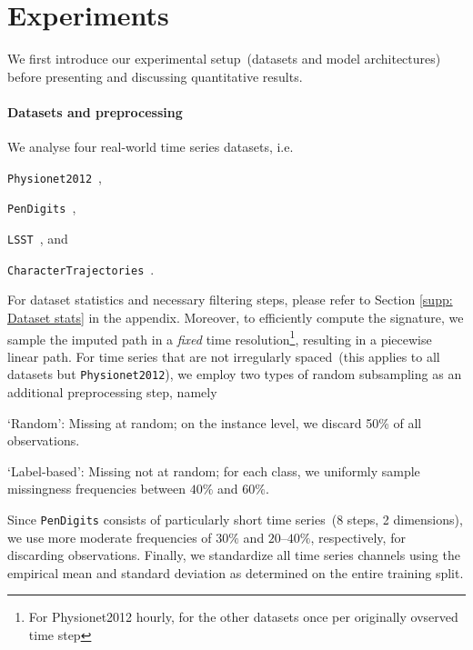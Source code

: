 \documentclass{article}
\begin{document}


\section{Experiments}

We first introduce our experimental setup~(datasets and model
architectures) before presenting and discussing quantitative results.

\paragraph{Datasets and preprocessing}

We analyse four real-world time series datasets, i.e.\
%
\begin{inparaenum}[(i)]
  \item \texttt{Physionet2012}~\citep{goldberger2000physiobank},
  \item \texttt{PenDigits}~\citep{Dua2019},
  \item \texttt{LSST}~\citep{allam2018photometric}, and
  \item \texttt{CharacterTrajectories}~\citep{Dua2019}.
\end{inparaenum}
%
For dataset statistics and necessary filtering steps, please refer to Section \ref{supp: Dataset stats} in the appendix.
Moreover, to efficiently compute the signature, we
sample the imputed path in a \emph{fixed} time resolution\footnote{For Physionet2012 hourly, for the other datasets once per originally ovserved time step}, resulting in
a piecewise linear path.
%
For time series that are not irregularly spaced~(this applies to all datasets but \texttt{Physionet2012}), we employ two types of random subsampling as an additional
preprocessing step,
namely
%
\begin{inparaenum}[(1)]
    \item `Random': Missing at random; on the instance level, we discard 50\% of all observations.
    \item `Label-based': Missing not at random; for each
      class, we uniformly sample missingness frequencies between $40\%$
      and $60\%$.
\end{inparaenum}
%
Since \texttt{PenDigits} consists of particularly short time series~(8
steps, 2 dimensions), we use more moderate frequencies of $30\%$
and $20$--$40\%$, respectively, for discarding observations.
Finally, we standardize all time series channels using the empirical mean and standard deviation as determined on the entire training split.
\end{document}
